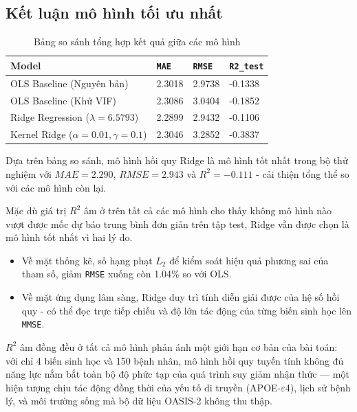 \newpage

\subsection{Kết luận mô hình tối ưu nhất}

\begin{table}[h!]
    \centering
    \renewcommand{\arraystretch}{1.3}
    \setlength{\tabcolsep}{8pt}
    \begin{tabular}{|p{6cm}|p{2cm}|p{2cm}|p{2cm}|}
        \hline
        \rowcolor[rgb]{0.8, 0.9, 1.0}
        \textbf{Model} & \textbf{\texttt{MAE}} & \textbf{\texttt{RMSE}} & \textbf{\texttt{R2\_test}} \\ \hline
        OLS Baseline (Nguyên bản) & 2.3018 & 2.9738 & -0.1338 \\ \hline
        OLS Baseline (Khử VIF) & 2.3086 & 3.0404 & -0.1852 \\ \hline
        \rowcolor[rgb]{0.85, 0.95, 0.85} 
        Ridge Regression ($\lambda=6.5793$) & 2.2899 & 2.9432 & -0.1106 \\ \hline
        Kernel Ridge ($\alpha=0.01, \gamma=0.1$) & 2.3046 & 3.2852 & -0.3837 \\ \hline
    \end{tabular}
    \caption{Bảng so sánh tổng hợp kết quả giữa các mô hình}
\end{table}

Dựa trên bảng so sánh, mô hình hồi quy Ridge là mô hình tốt nhất trong bộ thử nghiệm với $MAE = 2.290$, $RMSE = 2.943$ và $R^2 = -0.111$ - cải thiện tổng thể so với các mô hình còn lại.

Mặc dù giá trị $R^2$ âm ở trên tất cả các mô hình cho thấy không mô hình nào vượt được mốc dự báo trung bình đơn giản trên tập test, Ridge vẫn được chọn là mô hình tốt nhất vì hai lý do.

\begin{itemize}[topsep=0pt, itemsep=2.5pt, leftmargin=1.5cm]
    \item Về mặt thống kê, số hạng phạt $L_2$ để kiểm soát hiệu quả phương sai của tham số, giảm \texttt{RMSE} xuống còn 1.04\% so với OLS.
    \item Về mặt ứng dụng lâm sàng, Ridge duy trì tính diễn giải được của hệ số hồi quy - có thể đọc trực tiếp chiếu và độ lớn tác động của từng biến sinh học lên \texttt{MMSE}. 
\end{itemize}

$R^2$ âm đồng đều ở tất cả mô hình phản ánh một giới hạn cơ bản của bài toán: với chỉ 4 biến sinh học và 150 bệnh nhân, mô hình hồi quy tuyến tính không đủ năng lực nắm bắt toàn bộ độ phức tạp của quá trình suy giảm nhận thức — một hiện tượng chịu tác động đồng thời của yếu tố di truyền (APOE-$\varepsilon$4), lịch sử bệnh lý, và môi trường sống mà bộ dữ liệu OASIS-2 không thu thập.


